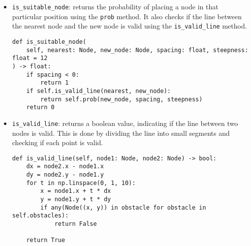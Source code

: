 \documentclass[12pt]{report}
\begin{document}
\begin{itemize}
          \begin{lstlisting}[caption={\texttt{Environment.prob}}]
def prob(self, node: Node, spacing: float, steepness: float = 12) -> float:
    if not self.obstacles:
        return 1
    if not self.is_valid_node(node):
        return 0
    min_r = min(obstacle.distance(node) for obstacle in self.obstacles)
    probability = 1 / (1 + math.exp(-steepness * (min_r - spacing)))
    return probability
    \end{lstlisting}

          \begin{figure}[H]
              \centering
              \begin{subfigure}{0.4\textwidth}
                  \texttt{[image: question\_1/data/lowsteep.png]}
                  \caption{Sigmoid Function with \textbf{Low Steepness}}
              \end{subfigure}
              \begin{subfigure}{0.4\textwidth}
                  \texttt{[image: question\_1/data/highsteep.png]}
                  \caption{Sigmoid Function with \textbf{High Steepness}}
              \end{subfigure}
          \end{figure}
    \item \texttt{is\_suitable\_node}: returns the probability of placing a node in that particular position using the \texttt{prob} method. It also checks if the line between the nearest node and the new node is valid using the \texttt{is\_valid\_line} method.
          \begin{lstlisting}[caption={\texttt{Environment.is\_suitable\_node}}]
def is_suitable_node(
    self, nearest: Node, new_node: Node, spacing: float, steepness: float = 12
) -> float:
    if spacing < 0:
        return 1
    if self.is_valid_line(nearest, new_node):
        return self.prob(new_node, spacing, steepness)
    return 0
    \end{lstlisting}
    \item \texttt{is\_valid\_line}: returns a boolean value, indicating if the line between two nodes is valid. This is done by dividing the line into small segments and checking if each point is valid.
          \begin{lstlisting}[caption={\texttt{Environment.is\_valid\_line}}]
def is_valid_line(self, node1: Node, node2: Node) -> bool:
    dx = node2.x - node1.x
    dy = node2.y - node1.y
    for t in np.linspace(0, 1, 10):
        x = node1.x + t * dx
        y = node1.y + t * dy
        if any(Node((x, y)) in obstacle for obstacle in self.obstacles):
            return False

    return True
    \end{lstlisting}
\end{itemize}
\end{document}
